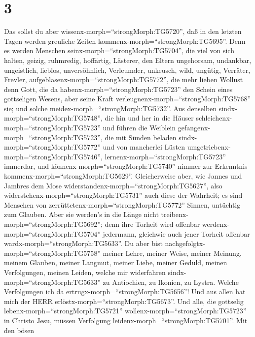 \hypertarget{section-2}{%
\section{3}\label{section-2}}

 Das sollst du aber wissenx-morph=``strongMorph:TG5720'',
daß in den letzten Tagen werden greuliche Zeiten
kommenx-morph=``strongMorph:TG5695''.  Denn es werden
Menschen seinx-morph=``strongMorph:TG5704'', die viel von sich halten,
geizig, ruhmredig, hoffärtig, Lästerer, den Eltern ungehorsam,
undankbar, ungeistlich,  lieblos, unversöhnlich, Verleumder,
unkeusch, wild, ungütig,  Verräter, Frevler,
aufgeblasenx-morph=``strongMorph:TG5772'', die mehr lieben Wollust denn
Gott,  die da habenx-morph=``strongMorph:TG5723'' den Schein
eines gottseligen Wesens, aber seine Kraft
verleugnenx-morph=``strongMorph:TG5768'' sie; und solche
meidex-morph=``strongMorph:TG5732''.  Aus denselben
sindx-morph=``strongMorph:TG5748'', die hin und her in die Häuser
schleichenx-morph=``strongMorph:TG5723'' und führen die Weiblein
gefangenx-morph=``strongMorph:TG5723'', die mit Sünden beladen
sindx-morph=``strongMorph:TG5772'' und von mancherlei Lüsten
umgetriebenx-morph=``strongMorph:TG5746'', 
lernenx-morph=``strongMorph:TG5723'' immerdar, und
könnenx-morph=``strongMorph:TG5740'' nimmer zur Erkenntnis
kommenx-morph=``strongMorph:TG5629''.  Gleicherweise aber,
wie Jannes und Jambres dem Mose
widerstandenx-morph=``strongMorph:TG5627'', also
widerstehenx-morph=``strongMorph:TG5731'' auch diese der Wahrheit; es
sind Menschen von zerrüttetenx-morph=``strongMorph:TG5772'' Sinnen,
untüchtig zum Glauben.  Aber sie werden's in die Länge nicht
treibenx-morph=``strongMorph:TG5692''; denn ihre Torheit wird offenbar
werdenx-morph=``strongMorph:TG5704'' jedermann, gleichwie auch jener
Torheit offenbar wardx-morph=``strongMorph:TG5633''.  Du
aber bist nachgefolgtx-morph=``strongMorph:TG5758'' meiner Lehre, meiner
Weise, meiner Meinung, meinem Glauben, meiner Langmut, meiner Liebe,
meiner Geduld,  meinen Verfolgungen, meinen Leiden, welche
mir widerfahren sindx-morph=``strongMorph:TG5633'' zu Antiochien, zu
Ikonien, zu Lystra. Welche Verfolgungen ich da
ertrugx-morph=``strongMorph:TG5656''! Und aus allen hat mich der HERR
erlöstx-morph=``strongMorph:TG5673''.  Und alle, die
gottselig lebenx-morph=``strongMorph:TG5721''
wollenx-morph=``strongMorph:TG5723'' in Christo Jesu, müssen Verfolgung
leidenx-morph=``strongMorph:TG5701''.  Mit den bösen
